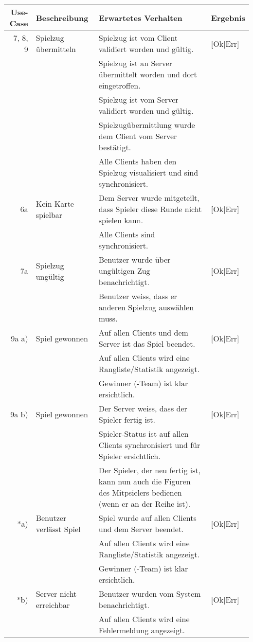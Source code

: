\documentclass[a4paper,12pt,halfparskip,DIV14]{scrartcl}
\begin{document}
\newpage

\begin {tabular}{r | p{3cm} | p{8cm} | l}
\toprule
\textbf{Use-Case} & \textbf{Beschreibung} & \textbf{Erwartetes Verhalten} & \textbf{Ergebnis} \\
\midrule
7, 8, 9 & Spielzug übermitteln & Spielzug ist vom Client validiert worden und gültig. & [Ok|Err] \\
 \cline{3-4} & & Spielzug ist an Server übermittelt worden und dort eingetroffen. & \\
 \cline{3-4} & & Spielzug ist vom Server validiert worden und gültig. & \\
 \cline{3-4} & & Spielzugübermittlung wurde dem Client vom Server bestätigt. & \\
 \cline{3-4} & & Alle Clients haben den Spielzug visualisiert und sind synchronisiert. & \\
\midrule
6a & Kein Karte spielbar & Dem Server wurde mitgeteilt, dass Spieler diese Runde nicht spielen kann. & [Ok|Err] \\
 \cline{3-4} & & Alle Clients sind synchronisiert. & \\
\midrule
7a & Spielzug ungültig & Benutzer wurde über ungültigen Zug benachrichtigt. & [Ok|Err] \\
 \cline{3-4} & & Benutzer weiss, dass er anderen Spielzug auswählen muss. & \\
\midrule
9a a) & Spiel gewonnen & Auf allen Clients und dem Server ist das Spiel beendet. & [Ok|Err] \\
 \cline{3-4} & & Auf allen Clients wird eine Rangliste/Statistik angezeigt. & \\
 \cline{3-4} & & Gewinner (-Team) ist klar ersichtlich. & \\
\midrule
9a b) & Spiel gewonnen & Der Server weiss, dass der Spieler fertig ist. & [Ok|Err] \\
 \cline{3-4} & & Spieler-Status ist auf allen Clients synchronisiert und für Spieler ersichtlich. & \\
 \cline{3-4} & & Der Spieler, der neu fertig ist, kann nun auch die Figuren des Mitpsielers bedienen (wenn er an der Reihe ist). & \\
\midrule
*a) & Benutzer verlässt Spiel & Spiel wurde auf allen Clients und dem Server beendet. & [Ok|Err] \\
 \cline{3-4} & & Auf allen Clients wird eine Rangliste/Statistik angezeigt. & \\
 \cline{3-4} & & Gewinner (-Team) ist klar ersichtlich. & \\
\midrule
*b) & Server nicht erreichbar & Benutzer wurden vom System benachrichtigt. & [Ok|Err] \\
 \cline{3-4} & & Auf allen Clients wird eine Fehlermeldung angezeigt. & \\
\bottomrule
\end{tabular}
\end{document}
